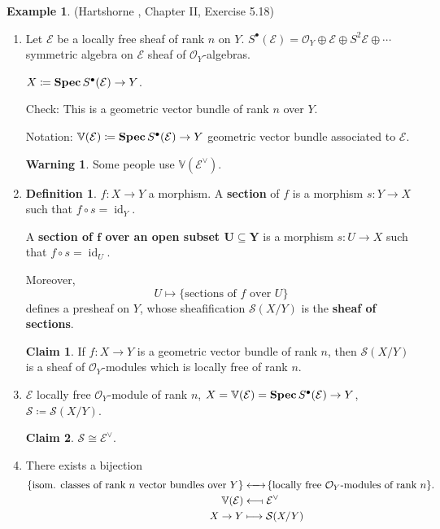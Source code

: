 \documentclass[12pt]{article}
\DeclareMathOperator{\id}{id}
\DeclareMathOperator{\relSpec}{\textnormal{\textbf{Spec}}}
\theoremstyle{definition}
\newtheorem*{definition}{Definition}
\newtheorem*{warning}{Warning}
\newtheorem*{claim}{Claim}
\newtheorem*{example}{Example}
\begin{document}
\begin{example}
(Hartshorne \cite{hartshorne2013algebraic}, Chapter II, Exercise 5.18)

\begin{enumerate}[label=\arabic*)]
\item Let $\mathcal{E}$ be a locally free sheaf of rank $n$ on $Y$. $S^{\bullet}(\mathcal{E})=\mathcal{O}_Y\oplus\mathcal{E}\oplus S^2\mathcal{E}\oplus\cdots$ symmetric algebra on $\mathcal{E}$ sheaf of $\mathcal{O}_Y$-algebras.

$X\coloneqq\relSpec S^{\bullet}(\mathcal{E})\rightarrow Y$.

Check: This is a geometric vector bundle of rank $n$ over $Y$.

Notation: $\mathbb{V}(\mathcal{E})\coloneqq\relSpec S^{\bullet}(\mathcal{E})\rightarrow Y$ geometric vector bundle associated to $\mathcal{E}$.

\begin{warning}
Some people use $\mathbb{V}(\mathcal{E}^{\vee})$.
\end{warning}

\item
\begin{definition}
$f:X\rightarrow Y$ a morphism. A \textbf{section} of $f$ is a morphism $s:Y\rightarrow X$ such that $f\circ s=\id_Y$.

A \textbf{section of $\boldsymbol{f}$ over an open subset $\boldsymbol{U\subseteq Y}$} is a morphism $s:U\rightarrow X$ such that $f\circ s=\id_U$.

Moreover,
\[U\longmapsto\{\text{sections of }f\text{ over }U\}\]
defines a presheaf on $Y$, whose sheafification $\mathcal{S}(X/Y)$ is the \textbf{sheaf of sections}.
\end{definition}

\begin{claim}
If $f:X\rightarrow Y$ is a geometric vector bundle of rank $n$, then $\mathcal{S}(X/Y)$ is a sheaf of $\mathcal{O}_Y$-modules which is locally free of rank $n$.
\end{claim}

\item $\mathcal{E}$ locally free $\mathcal{O}_Y$-module of rank $n$, $X=\mathbb{V}(\mathcal{E})=\relSpec S^{\bullet}(\mathcal{E})\rightarrow Y$, $\mathcal{S}\coloneqq\mathcal{S}(X/Y)$.

\begin{claim}
$\mathcal{S}\cong\mathcal{E}^{\vee}$.
\end{claim}

\item There exists a bijection
\begin{align*}
\{\text{isom. classes of rank }n\text{ vector bundles over }Y\}&\xleftrightarrow{\hspace{4.4mm}}\hspace{-0.5mm}\{\text{locally free }\mathcal{O}_Y\text{-modules of rank }n\}.\\
\mathbb{V}(\mathcal{E})&\longleftarrow\!\shortmid\mathcal{E}^{\vee}\\
X\rightarrow Y&\longmapsto\mathcal{S}(X/Y)
\end{align*}
\end{enumerate}
\end{example}
\end{document}
